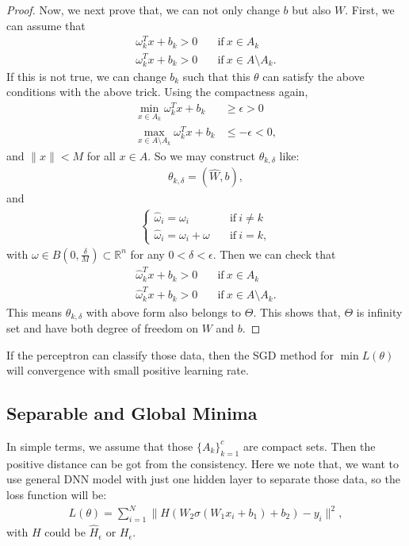 \begin{proof}
Now, we next prove that, we can not only change $b$ but also $W$. First, we can assume that
\begin{align}
\omega_k^T x + b_k > 0 \quad &\text{if}~ x \in A_k \\
\omega_k^T x + b_k >0 \quad &\text{if}~ x \in A \setminus A_k.
\end{align}
If this is not true, we can change $b_k$ such that this $\theta$ can satisfy the above conditions with the above trick. Using the compactness again,
\begin{align}
\min_{x\in A_k} \omega_k^T x + b_k &\ge \epsilon > 0 \\
\max_{x\in A\setminus A_k} \omega_k^T x + b_k &\le -\epsilon < 0,
\end{align}
and $\|x\| < M $ for all $x \in A$.
So we may construct $\theta_{k,\delta}$ like:
\begin{align}
\theta_{k,\delta} = (\hat{W}, b), 
\end{align}
and 
\begin{align}
\begin{cases}
\hat{\omega}_i = \omega_i \quad &\text{if}~ i \neq k \\
\hat{\omega}_i = \omega_i + \omega \quad &\text{if}~ i = k,
\end{cases}
\end{align}
with $\omega \in B(0, \frac{\delta}{M}) \subset \mathbb{R}^n$ for any $0 < \delta < \epsilon$. Then we can check that
\begin{align}
\hat{\omega}_k^T x + b_k > 0 \quad &\text{if}~ x \in A_k \\
\hat{\omega}_k^T x + b_k >0 \quad &\text{if}~ x \in A \setminus A_k.
\end{align}
This means $\theta_{k,\delta}$ with above form also belongs to $\Theta$. 
This shows that, $\Theta$ is infinity set and have both degree of freedom on $W$ and $b$.
\end{proof}


\begin{theorem}
If the perceptron can classify those data, then the SGD method for $\min L(\theta)$ will convergence with small positive learning rate. 
\end{theorem}

\subsection{Separable and Global Minima}
In simple terms, we assume that those $\{A_k\}_{k=1}^c$ are compact sets. Then the positive distance can be got from the consistency.  Here we note that, we want to use general DNN model with just one hidden layer to separate those data, so the loss function will be:
\begin{align}
L(\theta) = \sum_{i=1}^N\|H(W_2\sigma(W_1x_i + b_1) + b_2) - y_i\|^2, 
\end{align}
with $H$ could be $\hat{H}_{\epsilon}$ or $H_\epsilon$.

